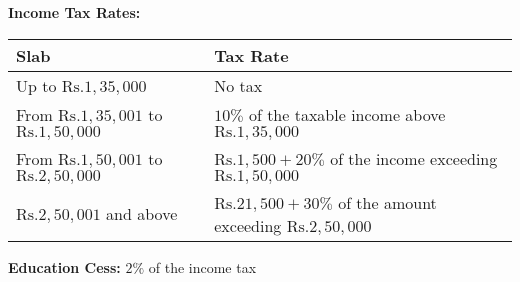 \begin{enumerate}
\textbf{Income Tax Rates:}

\begin{tabular}{|l|l|}
\hline
Slab & Tax Rate \\
\hline
Up to $\text{Rs.} 1,35,000$ & No tax \\
\hline
From $\text{Rs.} 1,35,001$ to $\text{Rs.} 1,50,000$ & $10\%$ of the taxable income above $\text{Rs.} 1,35,000$ \\
\hline
From $\text{Rs.} 1,50,001$ to $\text{Rs.} 2,50,000$ & $\text{Rs.} 1,500 + 20\%$ of the income exceeding $\text{Rs.} 1,50,000$ \\
\hline
$\text{Rs.} 2,50,001$ and above & $\text{Rs.} 21,500 + 30\%$ of the amount exceeding $\text{Rs.} 2,50,000$ \\
\hline
\end{tabular}

\textbf{Education Cess:} $2\%$ of the income tax


\end{enumerate}
